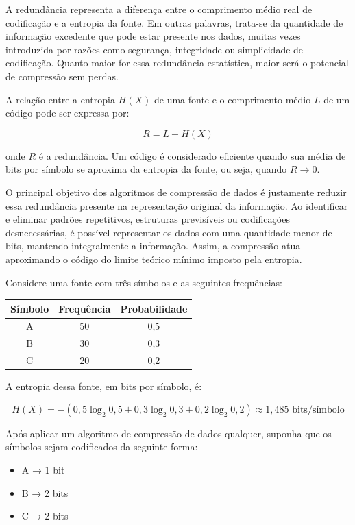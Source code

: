 A redundância representa a diferença entre o comprimento médio real de codificação e a entropia da fonte. Em outras palavras, trata-se da quantidade de informação excedente que pode estar presente nos dados, muitas vezes introduzida por razões como segurança, integridade ou simplicidade de codificação. Quanto maior for essa redundância estatística, maior será o potencial de compressão sem perdas.

A relação entre a entropia \( H(X) \) de uma fonte e o comprimento médio \( L \) de um código pode ser expressa por:

\[
R = L - H(X)
\]

onde \( R \) é a redundância. Um código é considerado eficiente quando sua média de bits por símbolo se aproxima da entropia da fonte, ou seja, quando \( R \to 0 \).

O principal objetivo dos algoritmos de compressão de dados é justamente reduzir essa redundância presente na representação original da informação. Ao identificar e eliminar padrões repetitivos, estruturas previsíveis ou codificações desnecessárias, é possível representar os dados com uma quantidade menor de bits, mantendo integralmente a informação. Assim, a compressão atua aproximando o código do limite teórico mínimo imposto pela entropia.

Considere uma fonte com três símbolos e as seguintes frequências:

\begin{center}
\begin{tabular}{ccc}
\toprule
Símbolo & Frequência & Probabilidade \\
\midrule
A & 50 & 0{,}5 \\
B & 30 & 0{,}3 \\
C & 20 & 0{,}2 \\
\bottomrule
\end{tabular}
\end{center}

A entropia dessa fonte, em bits por símbolo, é:

\[
H(X) = - (0{,}5 \log_2 0{,}5 + 0{,}3 \log_2 0{,}3 + 0{,}2 \log_2 0{,}2) \approx 1{,}485 \text{ bits/símbolo}
\]

Após aplicar um algoritmo de compressão de dados qualquer, suponha que os símbolos sejam codificados da seguinte forma:
\begin{itemize}
    \item A → 1 bit
    \item B → 2 bits
    \item C → 2 bits
\end{itemize}

